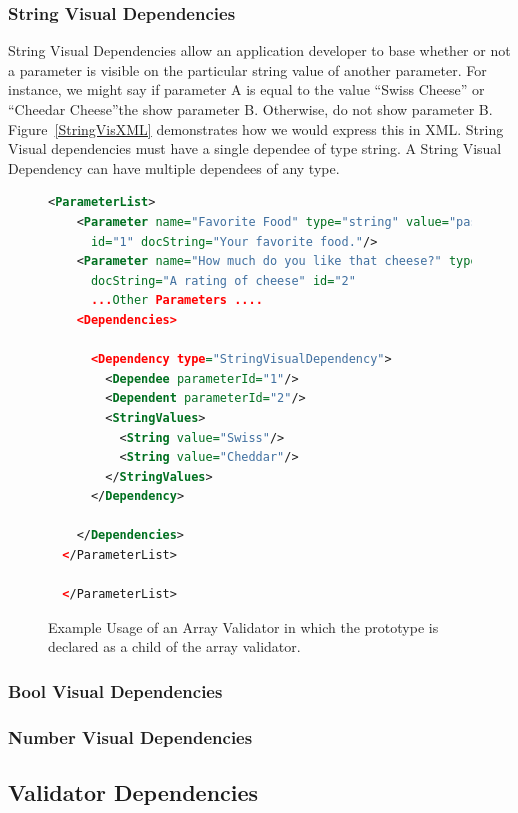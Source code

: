 \subsubsection{String Visual Dependencies}
String Visual Dependencies allow an application developer to base whether or not a parameter is visible on the particular string value of another
parameter. For instance, we might say if parameter A is equal to the value ``Swiss Cheese'' or ``Cheedar Cheese''the show parameter B. Otherwise, do not show parameter B.
Figure~\ref{StringVisXML} demonstrates how we would express this in XML. String Visual dependencies must have a single dependee of type string. A String Visual
Dependency can have multiple dependees of any type.
\begin{figure}
  \centering
  \begin{lstlisting}[language=XML]
  <ParameterList>
    <Parameter name="Favorite Food" type="string" value="pasta"
      id="1" docString="Your favorite food."/>
    <Parameter name="How much do you like that cheese?" type="int" value="5"
      docString="A rating of cheese" id="2"
      ...Other Parameters ....
    <Dependencies>

      <Dependency type="StringVisualDependency">
        <Dependee parameterId="1"/>
        <Dependent parameterId="2"/>
        <StringValues>
          <String value="Swiss"/>
          <String value="Cheddar"/>
        </StringValues>
      </Dependency>

    </Dependencies>
  </ParameterList>
        
  </ParameterList>
  \end{lstlisting}
  \caption{Example Usage of an Array Validator in which the prototype is declared as a child of the array validator.}
  \label{actualArrayValidatorXML}
\end{figure}

\subsubsection{Bool Visual Dependencies}

\subsubsection{Number Visual Dependencies}


\subsection{Validator Dependencies}

